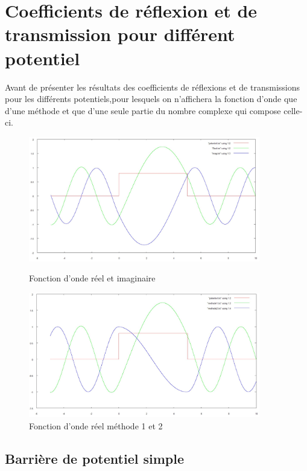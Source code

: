 \section{Coefficients de réflexion et de transmission pour différent potentiel}

Avant de présenter les résultats des coefficients de réflexions et de transmissions pour les différents potentiels,pour lesquels on n'affichera la fonction d'onde que d'une méthode et que d'une seule partie du nombre complexe qui compose celle-ci.


\begin{figure}[!ht]
    \begin{minipage}[c]{.46\linewidth}
        \centering
        \includegraphics[width=0.9\textwidth]{imag et reel.jpg}
        \caption{Fonction d'onde réel et imaginaire}
    \end{minipage}
    \hfill%
    \begin{minipage}[c]{.46\linewidth}
        \centering
        \includegraphics[width=0.9\textwidth]{methode12.jpg}
        \caption{Fonction d'onde réel méthode 1 et 2}
    \end{minipage}
\end{figure}

\subsection{Barrière de potentiel simple}

